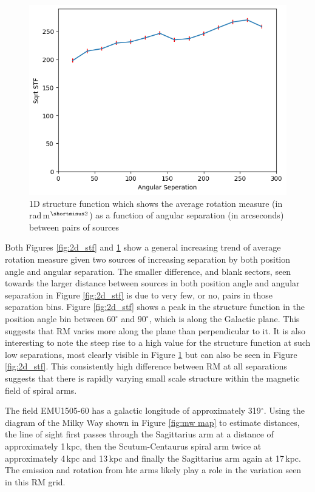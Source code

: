 \begin{figure}
        \centering
        \includegraphics[width=\linewidth]{Thesis_Template/Figures/1D Structure Function.png}
        \caption[1D Structure Function]{1D structure function which shows the average rotation measure (in rad$\,$m$^{\shortminus2}$) as a function of angular separation (in arcseconds) between pairs of sources}
        \label{fig:1d_stf}
    \end{figure}

Both Figures \ref{fig:2d_stf} and \ref{fig:1d_stf}  show a general increasing trend of average rotation measure given two sources of increasing separation by both position angle and angular separation. The smaller difference, and blank sectors, seen towards the larger distance between sources in both position angle and angular separation in Figure \ref{fig:2d_stf} is due to very few, or no, pairs in those separation bins. Figure \ref{fig:2d_stf} shows a peak in the structure function in the position angle bin between $60^\circ$ and $90^\circ$, which is along the Galactic plane. This suggests that RM varies more along the plane than perpendicular to it. It is also interesting to note the steep rise to a high value for the structure function at such low separations, most clearly visible in Figure \ref{fig:1d_stf} but can also be seen in Figure \ref{fig:2d_stf}. This consistently high difference between RM at all separations suggests that there is rapidly varying small scale structure within the magnetic field of spiral arms. 

The field EMU1505-60 has a galactic longitude of approximately 319$^\circ$. Using the diagram of the Milky Way shown in Figure \ref{fig:mw map} to estimate distances, the line of sight first passes through the Sagittarius arm at a distance of approximately 1$\,$kpc, then the Scutum-Centaurus spiral arm twice at approximately 4$\,$kpc and 13$\,$kpc and finally the Sagittarius arm again at 17$\,$kpc. The emission and rotation from hte arms likely play a role in the variation seen in this RM grid.

